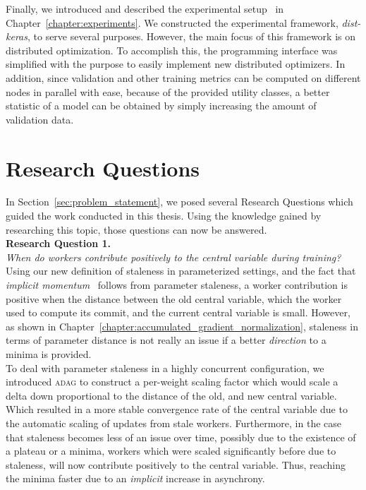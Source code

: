 Finally, we introduced and described the experimental setup~\cite{dist_keras} in Chapter~\ref{chapter:experiments}. We constructed the experimental framework, \emph{dist-keras}, to serve several purposes. However, the main focus of this framework is on distributed optimization. To accomplish this, the programming interface was simplified with the purpose to easily implement new distributed optimizers. In addition, since validation and other training metrics can be computed on different nodes in parallel with ease, because of the provided utility classes, a better statistic of a model can be obtained by simply increasing the amount of validation data.

\section{Research Questions}
\label{sec:conclusion_research_questions}

In Section~\ref{sec:problem_statement}, we posed several Research Questions which guided the work conducted in this thesis. Using the knowledge gained by researching this topic, those questions can now be answered.\\

\noindent \textbf{Research Question 1.}\\
\emph{When do workers contribute positively to the central variable during training?}\\

Using our new definition of staleness in parameterized settings, and the fact that \emph{implicit momentum}~\cite{implicitmomentum} follows from parameter staleness, a worker contribution is positive when the distance between the old central variable, which the worker used to compute its commit, and the current central variable is small. However, as shown in Chapter~\ref{chapter:accumulated_gradient_normalization}, staleness in terms of parameter distance is not really an issue if a better \emph{direction} to a minima is provided.\\

To deal with parameter staleness in a highly concurrent configuration, we introduced \textsc{adag} to construct a per-weight scaling factor which would scale a delta down proportional to the distance of the old, and new central variable. Which resulted in a more stable convergence rate of the central variable due to the automatic scaling of updates from stale workers. Furthermore, in the case that staleness becomes less of an issue over time, possibly due to the existence of a plateau or a minima, workers which were scaled significantly before due to staleness, will now contribute positively to the central variable. Thus, reaching the minima faster due to an \emph{implicit} increase in asynchrony.\\


